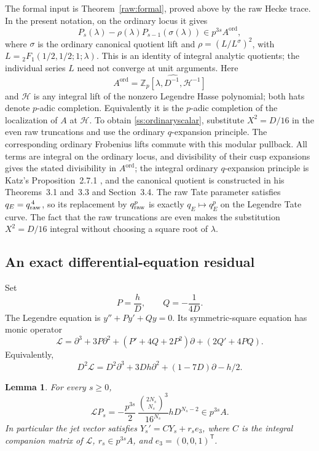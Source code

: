 \documentclass[11pt,a4paper]{article}
\newtheorem{lemma}[theorem]{Lemma}
\begin{document}
The formal input is Theorem~\ref{raw:formal}, proved above by the raw Hecke trace.  In the present notation, on the ordinary locus it gives
\begin{equation}\label{ss:ordinaryscalar}
 P_s(\lambda)-\rho(\lambda)P_{s-1}(\sigma(\lambda))
       \in p^{3s}A^{\mathrm{ord}},
\end{equation}
where $\sigma$ is the ordinary canonical quotient lift and
$\rho=(L/L^\sigma)^2$, with
$L={}_2F_1(1/2,1/2;1;\lambda)$.  This is an identity of integral analytic
quotients; the individual series $L$ need not converge at unit arguments.
Here
\[
 A^{\mathrm{ord}}=
 \widehat{\mathbb Z_p[\lambda,D^{-1},\mathscr H^{-1}]}
\]
and $\mathscr H$ is any integral lift of the nonzero Legendre Hasse
polynomial; both hats denote $p$-adic completion.  Equivalently it is
the $p$-adic completion of the localization of $A$ at $\mathscr H$.
To obtain \eqref{ss:ordinaryscalar}, substitute
$X^2=D/16$ in the even raw truncations and use the ordinary
$q$-expansion principle.  The corresponding ordinary Frobenius lifts
commute with this modular pullback.  All terms are integral on the
ordinary locus, and divisibility of their cusp expansions gives the
stated divisibility in $A^{\mathrm{ord}}$; the integral ordinary
$q$-expansion principle is Katz's Proposition~2.7.1
\cite{Katz}, and the canonical quotient is constructed in his
Theorems~3.1 and~3.3 and Section~3.4.  The raw Tate parameter satisfies
$q_E=q_{\rm raw}^{\,4}$, so its replacement by $q_{\rm raw}^p$ is exactly
$q_E\mapsto q_E^p$ on the Legendre Tate curve.  The fact that the raw
truncations are even makes the substitution $X^2=D/16$ integral without
choosing a square root of $\lambda$.

\subsection{An exact differential-equation residual}

Set
\[
 P=\frac{h}{D},\qquad Q=-\frac1{4D}.
\]
The Legendre equation is $y''+Py'+Qy=0$.  Its symmetric-square equation
has monic operator
\[
 \mathcal L=\partial^3+3P\partial^2+
    (P'+4Q+2P^2)\partial+(2Q'+4PQ).
\]
Equivalently,
\begin{equation}\label{ss:operator}
 D^2\mathcal L=D^2\partial^3+3Dh\partial^2+
                         (1-7D)\partial-h/2.
\end{equation}

\begin{lemma}\label{ss:residual}
For every $s\geq0$,
\[
 \mathcal L P_s
  =-\frac{p^{3s}}2\,
       \frac{\binom{2N_s}{N_s}^{3}}{16^{N_s}}
       h D^{N_s-2}\in p^{3s}A.
\]
In particular the jet vector satisfies
$Y_s'=CY_s+r_se_3$, where $C$ is the integral companion matrix of
$\mathcal L$, $r_s\in p^{3s}A$, and $e_3=(0,0,1)^{\mathsf T}$.
\end{lemma}
\end{document}
